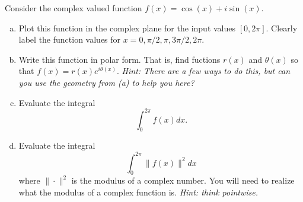\documentclass[12pt]{article} %
\begin{document}
\begin{problem}
	Consider the complex valued function $f(x) = \cos(x)+i\sin(x)$.  
	\begin{enumerate}[(a)]
		\item Plot this function in the complex plane for the input values $[0,2\pi]$. Clearly label the function values for $x=0,\pi/2,\pi,3\pi/2,2\pi$.
		\item Write this function in polar form. That is, find fuctions $r(x)$ and $\theta(x)$ so that $f(x)=r(x)e^{i\theta(x)}$. \emph{Hint: There are a few ways to do this, but can you use the geometry from (a) to help you here?}
		\item Evaluate the integral
		\[
			\int_0^{2\pi}f(x)dx.
		\]
		\item Evaluate the integral
		\[
			\int_0^{2\pi} \|f(x)\|^2dx
		\]
		where $\|\cdot\|^2$ is the modulus of a complex number. You will need to realize what the modulus of a complex function is. \emph{Hint: think pointwise.}
	\end{enumerate}
\end{problem}
\end{document}
